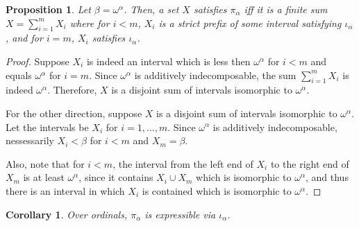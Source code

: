 \documentclass{article}
\newtheorem{corollary}{Corollary}
\newtheorem{proposition}{Proposition}
\newcommand{\ii}[1]{{\iota}_{#1}}
\newcommand{\pp}[1]{{\pi}_{#1}}
\begin{document}
\begin{proposition}
    Let $\beta = \omega^\alpha$.
    Then, a set $X$ satisfies $\pp{\alpha}$ iff it is a finite sum
    $X = \sum_{i=1}^m X_i$ where for $i<m$, $X_i$ is a strict prefix
    of some interval satisfying $\ii{\alpha}$, and
    for $i = m$, $X_i$ satisfies $\ii{\alpha}$.
\end{proposition}

\begin{proof}
    Suppose $X_i$ is indeed an interval which is less then $\omega^\alpha$ for $i < m$
    and equals $\omega^\alpha$ for $i = m$.
    Since $\omega^\alpha$ is additively indecomposable,
    the sum $\sum_{i=1}^m X_i$ is indeed $\omega^\alpha$.
    Therefore, $X$ is a disjoint sum of intervals isomorphic to $\omega^\alpha$.

    For the other direction,
    suppose $X$ is a disjoint sum of intervals isomorphic to $\omega^\alpha$.
    Let the intervals be $X_i$ for $i = 1, ..., m$.
    Since $\omega^\alpha$ is additively indecomposable,
    nessessarily $X_i < \beta$ for $i < m$ and $X_m = \beta$.
    
    Also, note that for $i < m$, the interval from the left end of $X_i$ to the
    right end of $X_m$ is at least $\omega^\alpha$,
    since it contains $X_i \cup X_m$ which is isomorphic to $\omega^\alpha$,
    and thus there is an interval in which $X_i$ is contained
    which is isomorphic to $\omega^\alpha$.
\end{proof}

\begin{corollary}
    Over ordinals, $\pp{\alpha}$ is expressible via $\ii{\alpha}$.
\end{corollary}
\end{document}
